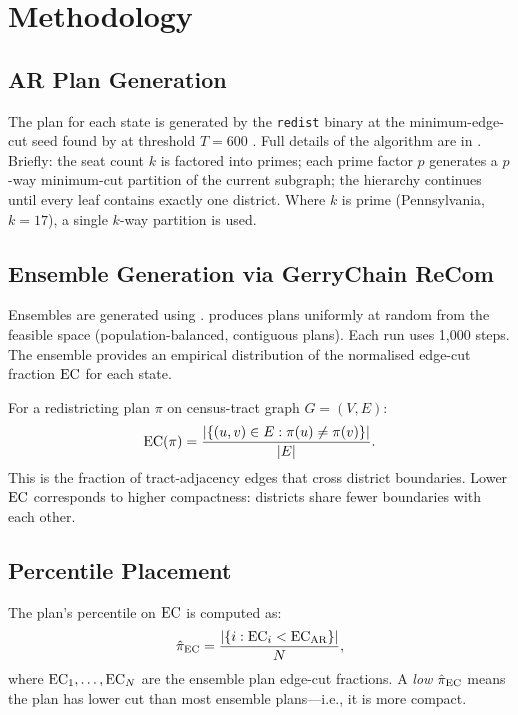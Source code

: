 \section{Methodology}
\label{sec:method}

\subsection{AR Plan Generation}

The \ar{} plan for each state is generated by the \texttt{redist} binary
at the minimum-edge-cut seed found by \cs{} at threshold $T = 600$
\citep{dellaLibera2026b16}.  Full details of the algorithm are in
\citet{dellaLibera2026b11}.  Briefly: the seat count $k$ is factored into
primes; each prime factor $p$ generates a $p$-way minimum-cut partition of
the current subgraph; the hierarchy continues until every leaf contains
exactly one district.  Where $k$ is prime (Pennsylvania, $k = 17$), a
single $k$-way partition is used.

\subsection{Ensemble Generation via GerryChain ReCom}

Ensembles are generated using \gc{} \recom{} \citep{deford2021recombination}.
\recom{} produces plans uniformly at random from the feasible space
(population-balanced, contiguous plans).  Each run uses 1,000 steps.
The ensemble provides an empirical distribution of the normalised edge-cut
fraction $\mathrm{EC}$ for each state.

\begin{definition}
For a redistricting plan $\pi$ on census-tract graph $G = (V, E)$:
\begin{equation}
  \mathrm{EC}(\pi) = \frac{|\{(u,v) \in E : \pi(u) \neq \pi(v)\}|}{|E|}.
\end{equation}
This is the fraction of tract-adjacency edges that cross district boundaries.
Lower $\mathrm{EC}$ corresponds to higher compactness: districts share fewer boundaries
with each other.
\end{definition}

\subsection{Percentile Placement}

The \ar{} plan's percentile on $\mathrm{EC}$ is computed as:
\begin{equation}
  \hat\pi_{\mathrm{EC}} = \frac{|\{i : \mathrm{EC}_i < \mathrm{EC}_{\mathrm{AR}}\}|}{N},
\end{equation}
where $\mathrm{EC}_1, \ldots, \mathrm{EC}_N$ are the ensemble plan edge-cut fractions.
A \emph{low} $\hat\pi_{\mathrm{EC}}$ means the \ar{} plan has lower cut than most
ensemble plans---i.e., it is more compact.

